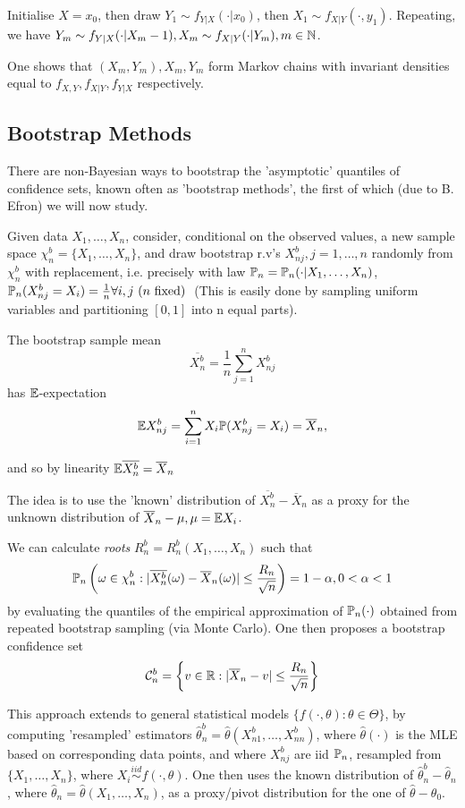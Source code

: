 \documentclass[a4paper]{article}
\begin{document}
Initialise $X= x_0$, then draw $Y_1 \sim f_{Y|X}(\cdot |x_0)$, then $X_1 \sim f_{X|Y}(\cdot , y_1)$. Repeating, we have $Y_m \sim f_{Y|X}(\cdot |X_m-1), X_m \sim f_{X|Y}(\cdot |Y_m), m \in \N$.

One shows that $(X_m, Y_m), X_m, Y_m$ form Markov chains with invariant densities equal to $f_{X,Y}, f_{X|Y}, f_{Y|X}$ respectively.

\subsection{Bootstrap Methods}

There are non-Bayesian ways to bootstrap the 'asymptotic' quantiles of confidence sets, known often as 'bootstrap methods', the first of which (due to B. Efron) we will now study.

Given data $X_1, \ldots, X_n$, consider, conditional on the observed values, a new sample space $\chi_n^{b} = \{X_1, \ldots, X_n\} $, and draw bootstrap r.v's $X_{nj}^{b}, j=1,\ldots,n$ randomly from $\chi_n^{b}$ with replacement, i.e. precisely with law $\P_n = \P_n(\cdot |X_1,\ldots,X_n)$, $\P_n (X_{nj}^{b} = X_i) = \frac{1}{n} \forall i,j \text{ ($n$ fixed) }$ (This is easily done by sampling uniform variables and partitioning  $[0,1]$ into n equal parts).

The bootstrap sample mean 
\[
\overline{X_n^{b}} = \frac{1}{n} \sum_{j=1}^{n} X_{nj}^{b} 
\] has $\E$-expectation
\[
	\E X_{nj}^{b} = \sum_{i=1}^{n} X_i \P(X_{nj}^{b} = X_i) = \overline{X}_n
,\] 

and so by linearity $\E \overline{X_n^{b}} = \overline{X}_n$

The idea is to use the 'known' distribution of $\overline{X_{n}^{b}} - \overline{X}_n$ as a proxy for the unknown distribution of $\overline{X}_n - \mu, \mu = \E X_i$.

We can calculate \textit{roots} $R_n^{b} = R_n^{b}(X_1,\ldots,X_n)$ such that
\[
	\P_n\left(\omega \in \chi_n^{b} : | \overline{X_n^{b}}(\omega) - \overline{X}_n(\omega)| \le \frac{R_n}{\sqrt{n} }\right) = 1- \alpha, 0 < \alpha < 1
\] by evaluating the quantiles of the empirical approximation  of $\P_n(\cdot )$ obtained from repeated bootstrap sampling (via Monte Carlo). One then proposes a bootstrap confidence set
\[
\mathcal{C}_n^{b} = \left\{v \in \R : |\overline{X}_n - v| \le  \frac{R_n}{\sqrt{n} }\right\} 
\] 

This approach extends to general statistical models $\{f\left( \cdot , \theta \right) : \theta \in \Theta \}$, by computing 'resampled' estimators $\hat{\theta}_n^{b} = \hat{\theta} (X_{n1}^{b}, \ldots, X_{nn}^{b})$, where  $\hat{\theta}(\cdot )$ is the MLE based on corresponding data points, and where $X_{nj}^{b}$ are iid $\P_n$, resampled from $\{X_1,\ldots,X_n\} $, where $X_i \stackrel{iid}{\sim} f(\cdot , \theta)$. One then uses the known distribution of $\hat{\theta}_n^{b} - \hat{\theta}_n$, where $\hat{\theta}_n = \hat{\theta}(X_1,\ldots,X_n)$, as a proxy/pivot distribution for the one of $\hat{\theta} - \theta_0$.
\end{document}
